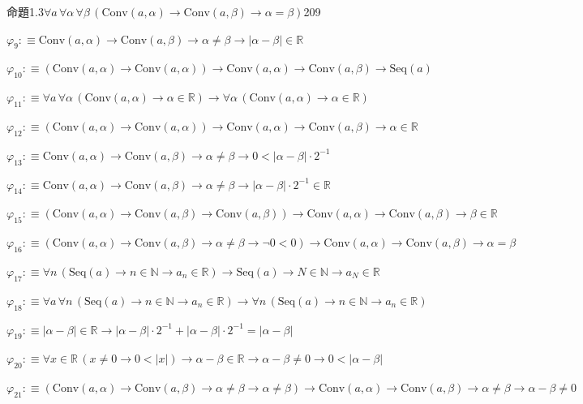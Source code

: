 \begin{fullproof}{命題1.3}{$\forall a\,\forall \alpha\,\forall \beta\,(\mathrm{Conv}(a,\alpha) \to \mathrm{Conv}(a,\beta) \to \alpha = \beta)$}{209}
\begin{abbrevlist}
\item $\varphi_{9} :\equiv \mathrm{Conv}(a,\alpha) \to \mathrm{Conv}(a,\beta) \to \alpha \neq \beta \to \lvert \alpha - \beta \rvert \in \mathbb{R}$
\item $\varphi_{10} :\equiv (\mathrm{Conv}(a,\alpha) \to \mathrm{Conv}(a,\alpha)) \to \mathrm{Conv}(a,\alpha) \to \mathrm{Conv}(a,\beta) \to \mathrm{Seq}(a)$
\item $\varphi_{11} :\equiv \forall a\,\forall \alpha\,(\mathrm{Conv}(a,\alpha) \to \alpha \in \mathbb{R}) \to \forall \alpha\,(\mathrm{Conv}(a,\alpha) \to \alpha \in \mathbb{R})$
\item $\varphi_{12} :\equiv (\mathrm{Conv}(a,\alpha) \to \mathrm{Conv}(a,\alpha)) \to \mathrm{Conv}(a,\alpha) \to \mathrm{Conv}(a,\beta) \to \alpha \in \mathbb{R}$
\item $\varphi_{13} :\equiv \mathrm{Conv}(a,\alpha) \to \mathrm{Conv}(a,\beta) \to \alpha \neq \beta \to 0 < \lvert \alpha - \beta \rvert \cdot 2^{-1}$
\item $\varphi_{14} :\equiv \mathrm{Conv}(a,\alpha) \to \mathrm{Conv}(a,\beta) \to \alpha \neq \beta \to \lvert \alpha - \beta \rvert \cdot 2^{-1} \in \mathbb{R}$
\item $\varphi_{15} :\equiv (\mathrm{Conv}(a,\alpha) \to \mathrm{Conv}(a,\beta) \to \mathrm{Conv}(a,\beta)) \to \mathrm{Conv}(a,\alpha) \to \mathrm{Conv}(a,\beta) \to \beta \in \mathbb{R}$
\item $\varphi_{16} :\equiv (\mathrm{Conv}(a,\alpha) \to \mathrm{Conv}(a,\beta) \to \alpha \neq \beta \to \neg 0 < 0) \to \mathrm{Conv}(a,\alpha) \to \mathrm{Conv}(a,\beta) \to \alpha = \beta$
\item $\varphi_{17} :\equiv \forall n\,(\mathrm{Seq}(a) \to n \in \mathbb{N} \to a_{n} \in \mathbb{R}) \to \mathrm{Seq}(a) \to N \in \mathbb{N} \to a_{N} \in \mathbb{R}$
\item $\varphi_{18} :\equiv \forall a\,\forall n\,(\mathrm{Seq}(a) \to n \in \mathbb{N} \to a_{n} \in \mathbb{R}) \to \forall n\,(\mathrm{Seq}(a) \to n \in \mathbb{N} \to a_{n} \in \mathbb{R})$
\item $\varphi_{19} :\equiv \lvert \alpha - \beta \rvert \in \mathbb{R} \to \lvert \alpha - \beta \rvert \cdot 2^{-1} + \lvert \alpha - \beta \rvert \cdot 2^{-1} = \lvert \alpha - \beta \rvert$
\item $\varphi_{20} :\equiv \forall x \in \mathbb{R}\,(x \neq 0 \to 0 < \lvert x \rvert) \to \alpha - \beta \in \mathbb{R} \to \alpha - \beta \neq 0 \to 0 < \lvert \alpha - \beta \rvert$
\item $\varphi_{21} :\equiv (\mathrm{Conv}(a,\alpha) \to \mathrm{Conv}(a,\beta) \to \alpha \neq \beta \to \alpha \neq \beta) \to \mathrm{Conv}(a,\alpha) \to \mathrm{Conv}(a,\beta) \to \alpha \neq \beta \to \alpha - \beta \neq 0$

\end{abbrevlist}
\end{fullproof}
